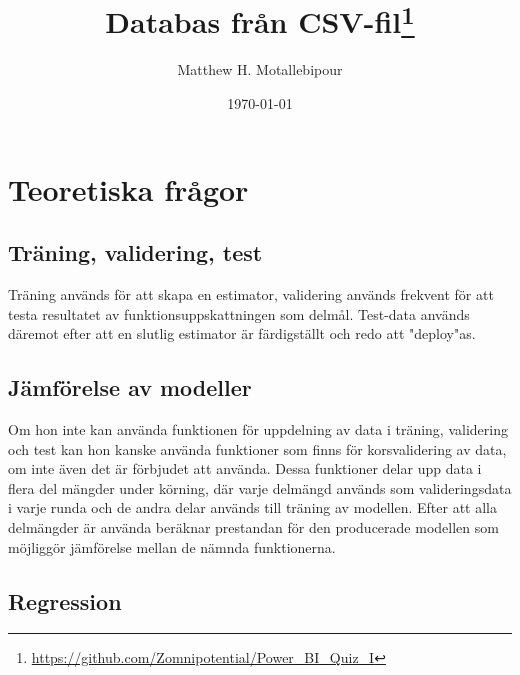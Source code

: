 \documentclass[10pt]{article}
\begin{document}

\title{Databas från CSV-fil\footnote{\footnotesize{\href{https://github.com/Zomnipotential/Power\_BI\_Quiz_I}{https://github.com/Zomnipotential/Power\_BI\_Quiz\_I}}}}
\author{Matthew H. Motallebipour}
\date{\today}
\maketitle

\section{Teoretiska frågor}

\subsection{Träning, validering, test}

Träning används för att skapa en estimator, validering används frekvent för att testa resultatet av funktionsuppskattningen som delmål. Test-data används däremot efter att en slutlig estimator är färdigställt och redo att "deploy"as.

\subsection{Jämförelse av modeller}

Om hon inte kan använda funktionen för uppdelning av data i träning, validering och test kan hon kanske använda funktioner som finns för korsvalidering av data, om inte även det är förbjudet att använda. Dessa funktioner delar upp data i flera del mängder under körning, där varje delmängd används som valideringsdata i varje runda och de andra delar används till träning av modellen. Efter att alla delmängder är använda beräknar prestandan för den producerade modellen som möjliggör jämförelse mellan de nämnda funktionerna.

\subsection{Regression}
\end{document}
